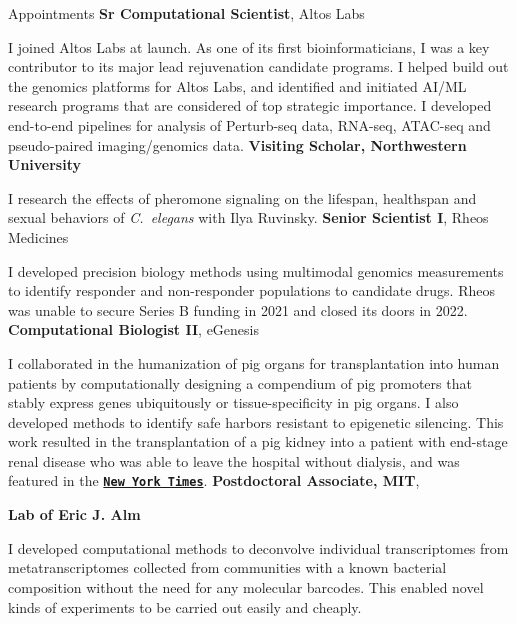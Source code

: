 \begin{rubric}{Appointments}
	\textbf{Sr Computational Scientist}, Altos Labs\par
	I joined Altos Labs at launch. As one of its first bioinformaticians,
	I was a key contributor to its major lead rejuvenation candidate programs.
	I helped build out the genomics platforms for Altos Labs, and identified
	and initiated AI/ML research programs that are considered of top strategic
	importance. I developed end-to-end pipelines for analysis of Perturb-seq data,
	RNA-seq, ATAC-seq and pseudo-paired imaging/genomics data.
	\textbf{Visiting Scholar, Northwestern University}\par
	I research the effects of pheromone signaling on the lifespan, healthspan and sexual
	behaviors of \textit{C.~elegans} with Ilya Ruvinsky.
\entry*[03/2021 - 01/2022]
	\textbf{Senior Scientist I}, Rheos Medicines\par
	I developed precision biology methods using multimodal genomics measurements to
	identify responder and non-responder populations to candidate drugs.
	Rheos was unable to secure Series B funding in 2021 and closed its doors in 2022.
\entry*[11/2019 - 3/2021]
	\textbf{Computational Biologist II}, eGenesis\par
	I collaborated in the humanization of pig organs for transplantation into human patients
	by computationally designing a compendium of pig promoters that stably
	express genes ubiquitously or tissue-specificity in pig organs. I also
	developed methods to identify safe harbors resistant to epigenetic silencing.
	This work resulted in the transplantation of a pig kidney into a patient with
	end-stage renal disease who was able to leave the hospital without dialysis,
	and was featured in the 
	\href{https://www.nytimes.com/2024/03/21/health/pig-kidney-organ-transplant.html}{\texttt{\textbf{New York Times}}}.
\entry*[01/2019--11/2019]
		\textbf{Postdoctoral Associate, MIT},\par
		\textbf{Lab of Eric J. Alm}\par	
		I developed computational methods to deconvolve individual transcriptomes
		from metatranscriptomes collected from communities with a known bacterial
		composition without the need for any molecular barcodes. This enabled novel
		kinds of experiments to be carried out easily and cheaply.	
\end{rubric}
